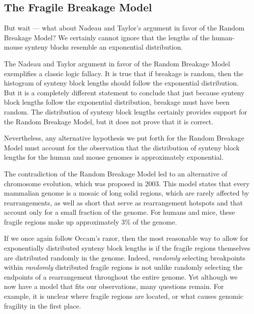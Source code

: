 \subsection{The Fragile Breakage Model}
\label{subsec:the_fragile_breakage_model}

But wait --- what about Nadeau and Taylor's argument in favor of the Random Breakage Model?  We certainly cannot ignore that the lengths of the human-mouse synteny blocks resemble an exponential distribution.\\

\begin{qbox}\end{qbox}

\noindent The Nadeau and Taylor argument in favor of the Random Breakage Model exemplifies a classic logic fallacy.  It is true that if breakage is random, then the histogram of synteny block lengths should follow the exponential distribution. But it is a completely different statement to conclude that just because synteny block lengths follow the exponential distribution, breakage must have been random.  The distribution of synteny block lengths certainly provides support for the Random Breakage Model, but it does not prove that it is correct.

Nevertheless, any alternative hypothesis we put forth for the Random Breakage Model must account for the observation that the distribution of synteny block lengths for the human and mouse genomes is approximately exponential.\\

\begin{qbox}\end{qbox}

\noindent The contradiction of the Random Breakage Model led to an alternative  of chromosome evolution, which was proposed in 2003.  This model states that every mammalian genome is a mosaic of long solid regions, which are rarely affected by rearrangements, as well as short  that serve as rearrangement hotspots and that account only for a small fraction of the genome.  For humans and mice, these fragile regions make up approximately 3\% of the genome.

If we once again follow Occam's razor, then the most reasonable way to allow for exponentially distributed synteny block lengths is if the fragile regions themselves are distributed randomly in the genome. Indeed, \emph{randomly} selecting breakpoints within \emph{randomly} distributed fragile regions is not unlike randomly selecting the endpoints of a rearrangement throughout the entire genome.  Yet although we now have a model that fits our observations, many questions remain. For example, it is unclear where fragile regions are located, or what causes genomic fragility in the first place.\\

